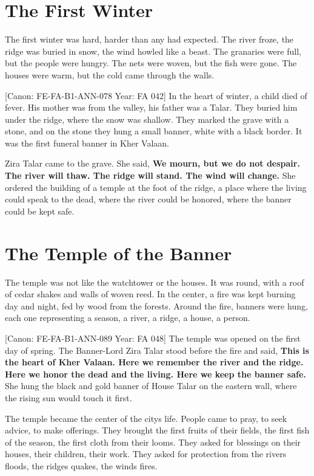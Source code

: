 \section{The First Winter}\label{the-first-winter}

The first winter was hard, harder than any had expected. The river
froze, the ridge was buried in snow, the wind howled like a beast. The
granaries were full, but the people were hungry. The nets were woven,
but the fish were gone. The houses were warm, but the cold came through
the walls.

{[}Canon: FE-FA-B1-ANN-078 \textbar{} Year: FA 042{]} In the heart of
winter, a child died of fever. His mother was from the valley, his
father was a Talar. They buried him under the ridge, where the snow was
shallow. They marked the grave with a stone, and on the stone they hung
a small banner, white with a black border. It was the first funeral
banner in Kher Valaan.

Zira Talar came to the grave. She said, \textbf{We mourn, but we do not
despair. The river will thaw. The ridge will stand. The wind will
change.} She ordered the building of a temple at the foot of the ridge,
a place where the living could speak to the dead, where the river could
be honored, where the banner could be kept safe.

\section{The Temple of the Banner}\label{the-temple-of-the-banner}

The temple was not like the watchtower or the houses. It was round, with
a roof of cedar shakes and walls of woven reed. In the center, a fire
was kept burning day and night, fed by wood from the forests. Around the
fire, banners were hung, each one representing a season, a river, a
ridge, a house, a person.

{[}Canon: FE-FA-B1-ANN-089 \textbar{} Year: FA 048{]} The temple was
opened on the first day of spring. The Banner-Lord Zira Talar stood
before the fire and said, \textbf{This is the heart of Kher Valaan. Here
we remember the river and the ridge. Here we honor the dead and the
living. Here we keep the banner safe.} She hung the black and gold
banner of House Talar on the eastern wall, where the rising sun would
touch it first.

The temple became the center of the city\textquotesingle s life. People
came to pray, to seek advice, to make offerings. They brought the first
fruits of their fields, the first fish of the season, the first cloth
from their looms. They asked for blessings on their houses, their
children, their work. They asked for protection from the
river\textquotesingle s floods, the ridge\textquotesingle s quakes, the
wind\textquotesingle s fires.

